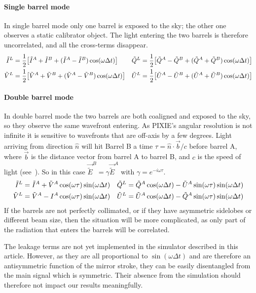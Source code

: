 \documentclass{article}
\newcommand{\I}{\tilde I}
\newcommand{\Q}{\tilde Q}
\newcommand{\U}{\tilde U}
\newcommand{\V}{\tilde V}
\newcommand{\J}{{\tilde E}}
\begin{document}
\paragraph{Single barrel mode}
In single barrel mode only one barrel is exposed to the sky; the other one
observes a static calibrator object. The light entering the two barrels is
therefore uncorrelated, and all the cross-terms disappear.
\begin{align}
	\I^L &= \frac12\big[\I^A+\I^B+(\I^A-\I^B)\cos(\omega\Delta t)\big] &
	\Q^L &= \frac12\big[\Q^A-\Q^B+(\Q^A+\Q^B)\cos(\omega\Delta t)\big] \notag \\
	\V^L &= \frac12\big[\V^A+\V^B+(\V^A-\V^B)\cos(\omega\Delta t)\big] &
	\U^L &= \frac12\big[\U^A-\U^B+(\U^A+\U^B)\cos(\omega\Delta t)\big] \label{eq:single}
\end{align}

\paragraph{Double barrel mode}
In double barrel mode the two barrels are both coaligned and exposed to the sky,
so they observe the same wavefront entering. As PIXIE's angular resolution is
not infinite it is sensitive to wavefronts that are off-axis by a few degrees.
Light arriving from direction $\hat n$ will hit Barrel B a time
$\tau = \hat n \cdot \vec b / c$ before barrel A, where $\vec b$ is the distance vector from
barrel A to barrel B, and $c$ is the speed of light (see~\cite{pixie_array}).
So in this case $\vec \J^B = \gamma \vec\J^A$ with $\gamma = e^{-i\omega\tau}$.
\begin{align}
	\I^L &= \I^A+\V^A\cos(\omega\tau)\sin(\omega\Delta t) &
	\Q^L &= \Q^A\cos(\omega\Delta t)-\U^A\sin(\omega\tau)\sin(\omega\Delta t) \notag \\
	\V^L &= \V^A-I^A\cos(\omega\tau)\sin(\omega\Delta t) &
	\U^L &= \U^A\cos(\omega\Delta t)-\Q^A\sin(\omega\tau)\sin(\omega\Delta t) \label{eq:double}
\end{align}
If the barrels are not perfectly collimated, or if they have asymmetric sidelobes or different beam size,
then the situation will be more complicated, as only part of the radiation that
enters the barrels will be correlated.

The leakage terms are not yet implemented in the simulator described in this
article. However, as they are all proportional to $\sin(\omega\Delta t)$ and
are therefore an antisymmetric function of the mirror stroke, they can be
easily disentangled from the main signal which is symmetric. Their absence
from the simulation should therefore not impact our results meaningfully.
\end{document}
